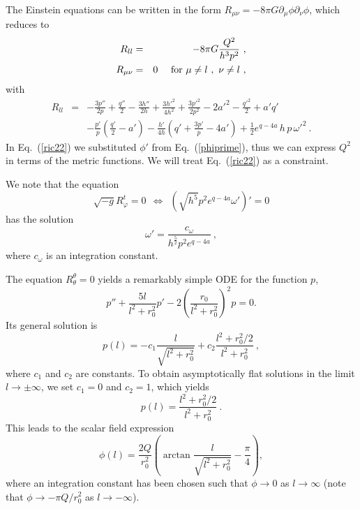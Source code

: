 \documentclass[showpacs,preprintnumbers,amsmath,amssymb,floatfix]{revtex4}
\newcommand{\vphi}{\varphi}
\begin{document}
The Einstein equations can be written in the form 
$R_{\mu\nu} = - 8\pi G \partial_\mu \phi\partial_\nu \phi$, which reduces 
to 
%
\begin{eqnarray}
R_{ll} & = & - 8\pi G \frac{Q^2}{ h^3 p^2} \ ,
\label{ric22} \\
R_{\mu\nu} & = & 0 \ \ \ \ {\rm for} \ \mu\neq l\ , \ \nu\neq l \ ,
\label{Eineqs}
\end{eqnarray}
%
  with 
\begin{eqnarray}
\label{Rll-expr}
R_{ll} & = & -\frac{3p''}{2p}
+\frac{q''}{2}
-\frac{3h''}{2h}
+\frac{3h'^2}{4h^2}
+\frac{3p'^2}{2p^2}
-2a'^2
-\frac{ q'^2}{2}
+a'q' 
\nonumber\\
& &
 -\frac{p'}{p}(\frac{q'}{2}-a')
-\frac{h'}{4h}(q'+ \frac{3p'}{p}-4a' )
+\frac{1}{2}e^{q-4a}\,h\,p\, \omega'^2 \ .
\end{eqnarray}
In Eq.~(\ref{ric22}) we substituted $\phi'$ from Eq.~(\ref{phiprime}),
thus we can express
$Q^2$ in terms of the metric functions.
We will treat Eq.~(\ref{ric22}) as a constraint.

We note that the equation
%
\begin{equation}
\sqrt{-g}R^t_\vphi = 0 \ \
\Longleftrightarrow  \ \
 \left(\sqrt{h^5}p^2 e^{q-4a}\omega'\right)' = 0 
\label{omeq}
\end{equation}
has the solution
%
\begin{equation}
\omega' = \frac{c_\omega}{h^{\frac{5}{2}}p^2 e^{q-4a}} \ ,
\label{omprime}
\end{equation}
%
where $c_\omega$ is  an integration constant. 

The equation $R^\theta_\theta=0$ yields a remarkably simple
ODE for the function $p$,
%
\begin{equation}
p'' + \frac{5 l}{l^2+r_0^2} p'-2 \left(\frac{r_0}{l^2+r_0^2}\right)^2 p = 0.
\label{eqp}
\end{equation}
%
Its general solution is
%
\begin{equation}
p(l) = -c_1 \frac{l}{\sqrt{l^2+r_0^2}} 
      + c_2\frac{l^2+r_0^2/2}{l^2+r_0^2} \ ,
\label{solp1}
\end{equation}
%
where $c_1$ and $c_2$ are constants.
To obtain asymptotically flat solutions in the limit $l \to \pm \infty$,
we set $c_1=0$ and $c_2=1$, which yields
%
\begin{equation}
p(l) = \frac{l^2+r_0^2/2}{l^2+r_0^2} \ .
\label{solp}
\end{equation}
%
This leads to the scalar field expression 
\begin{equation}
\phi(l) = \frac{2Q }{ r_0^2} 
\left( 
{\arctan}\frac{l}{\sqrt{l^2+r_0^2}}-\frac{\pi}{4}
\right),
\label{scalar}
\end{equation}
where an integration constant has been chosen 
such that $\phi \to 0$
as $l \to \infty$ (note that $\phi \to  -\pi Q/ r_0^2$ as $l \to -\infty$). 
\end{document}
